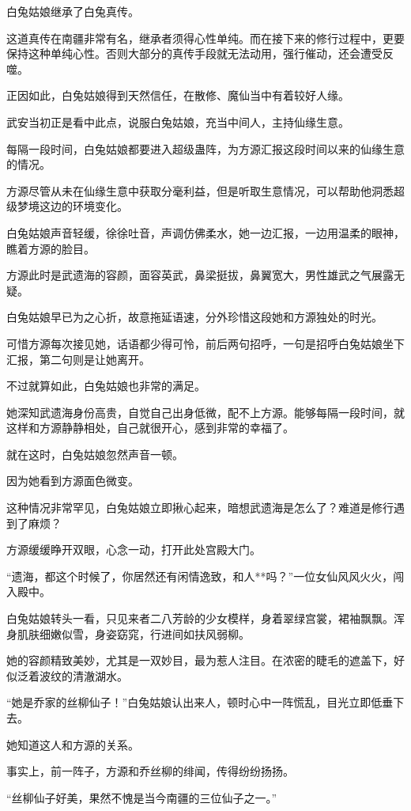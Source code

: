 \begin{this_body}
白兔姑娘继承了白兔真传。

这道真传在南疆非常有名，继承者须得心性单纯。而在接下来的修行过程中，更要保持这种单纯心性。否则大部分的真传手段就无法动用，强行催动，还会遭受反噬。

正因如此，白兔姑娘得到天然信任，在散修、魔仙当中有着较好人缘。

武安当初正是看中此点，说服白兔姑娘，充当中间人，主持仙缘生意。

每隔一段时间，白兔姑娘都要进入超级蛊阵，为方源汇报这段时间以来的仙缘生意的情况。

方源尽管从未在仙缘生意中获取分毫利益，但是听取生意情况，可以帮助他洞悉超级梦境这边的环境变化。

白兔姑娘声音轻缓，徐徐吐音，声调仿佛柔水，她一边汇报，一边用温柔的眼神，瞧着方源的脸目。

方源此时是武遗海的容颜，面容英武，鼻梁挺拔，鼻翼宽大，男性雄武之气展露无疑。

白兔姑娘早已为之心折，故意拖延语速，分外珍惜这段她和方源独处的时光。

可惜方源每次接见她，话语都少得可怜，前后两句招呼，一句是招呼白兔姑娘坐下汇报，第二句则是让她离开。

不过就算如此，白兔姑娘也非常的满足。

她深知武遗海身份高贵，自觉自己出身低微，配不上方源。能够每隔一段时间，就这样和方源静静相处，自己就很开心，感到非常的幸福了。

就在这时，白兔姑娘忽然声音一顿。

因为她看到方源面色微变。

这种情况非常罕见，白兔姑娘立即揪心起来，暗想武遗海是怎么了？难道是修行遇到了麻烦？

方源缓缓睁开双眼，心念一动，打开此处宫殿大门。

“遗海，都这个时候了，你居然还有闲情逸致，和人**吗？”一位女仙风风火火，闯入殿中。

白兔姑娘转头一看，只见来者二八芳龄的少女模样，身着翠绿宫裳，裙袖飘飘。浑身肌肤细嫩似雪，身姿窈窕，行进间如扶风弱柳。

她的容颜精致美妙，尤其是一双妙目，最为惹人注目。在浓密的睫毛的遮盖下，好似泛着波纹的清澈湖水。

“她是乔家的丝柳仙子！”白兔姑娘认出来人，顿时心中一阵慌乱，目光立即低垂下去。

她知道这人和方源的关系。

事实上，前一阵子，方源和乔丝柳的绯闻，传得纷纷扬扬。

“丝柳仙子好美，果然不愧是当今南疆的三位仙子之一。”


\end{this_body}
